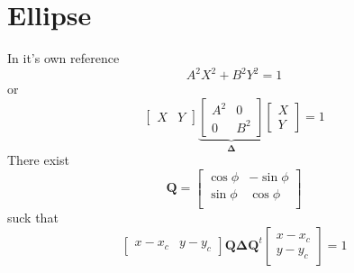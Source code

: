 \documentclass[aps]{revtex4}
\begin{document}
\section{Ellipse}
In it's own reference
\begin{equation}
	A^2X^2+B^2Y^2=1
\end{equation}
or
\begin{equation}
	\begin{bmatrix}
	X & Y
	\end{bmatrix}
	\underbrace{
	\begin{bmatrix}
	A^2&0\\
	0&B^2
	\end{bmatrix}
	}_{\displaystyle \bm{\Delta}}
	\begin{bmatrix}
	X\\
	Y
	\end{bmatrix}
	=1
\end{equation}
There exist 
\begin{equation}
	\bm{Q} =
	\begin{bmatrix}
	\cos\phi & -\sin\phi\\
	\sin\phi & \cos\phi\\
	\end{bmatrix}
\end{equation}
suck that
\begin{equation}
	\begin{bmatrix}
	x-x_c & y-y_c
	\end{bmatrix}
	\bm{Q}\bm{\Delta}\bm{Q}^t
	\begin{bmatrix}
	x-x_c\\
	y-y_c
	\end{bmatrix} = 1
\end{equation}
\end{document}

